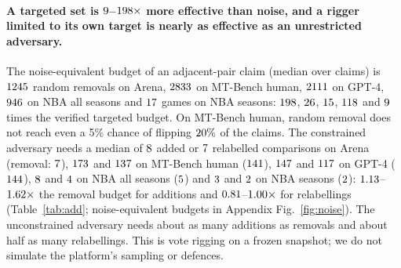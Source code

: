 \documentclass{article}
\begin{document}
\paragraph{A targeted set is $9$--$198\times$ more effective than noise, and a rigger limited to its own target is nearly as effective as an unrestricted adversary.} The noise-equivalent budget of an adjacent-pair claim (median over claims) is $1245$ random removals on Arena, $2833$ on MT-Bench human, $2111$ on GPT-4, $946$ on NBA all seasons and $17$ games on NBA seasons: $198$, $26$, $15$, $118$ and $9$ times the verified targeted budget. On MT-Bench human, random removal does not reach even a 5\% chance of flipping $20\%$ of the claims. The constrained adversary needs a median of $8$ added or $7$ relabelled comparisons on Arena (removal: $7$), $173$ and $137$ on MT-Bench human ($141$), $147$ and $117$ on GPT-4 ($144$), $8$ and $4$ on NBA all seasons ($5$) and $3$ and $2$ on NBA seasons ($2$): $1.13$--$1.62\times$ the removal budget for additions and $0.81$--$1.00\times$ for relabellings (Table~\ref{tab:add}; noise-equivalent budgets in Appendix Fig.~\ref{fig:noise}). The unconstrained adversary needs about as many additions as removals and about half as many relabellings. This is vote rigging \citep{min2025rigging} on a frozen snapshot; we do not simulate the platform's sampling or defences.

\begin{table}[t]
\caption{Verified budgets to reverse adjacent-pair claims by removing, adding or relabelling comparisons (medians over claims; ratio to removal as median [IQR]), unconstrained and constrained to the target (all added or relabelled comparisons involve the target). Noise-equivalent budgets: Fig.~\ref{fig:noise}.}
\label{tab:add}
\centering\scriptsize
\resizebox{\linewidth}{!}{}
\end{table}
\end{document}
